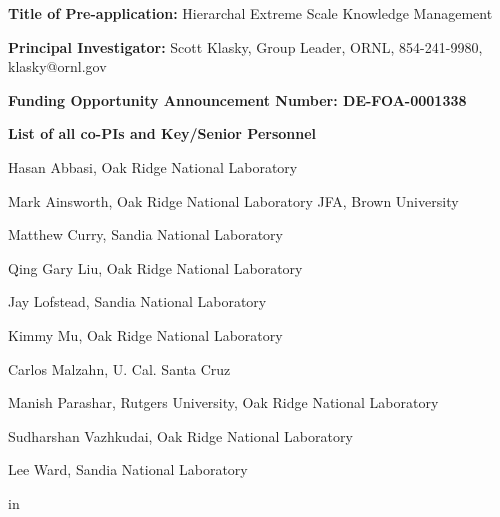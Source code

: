 \documentclass[11pt,letterpaper]{article}
\begin{document}

% 









%

{\bf Title of Pre-application:} Hierarchal Extreme Scale Knowledge Management \par
{\bf Principal Investigator:} Scott Klasky, Group Leader, ORNL, 854-241-9980, klasky@ornl.gov \par
{\bf Funding Opportunity Announcement Number: DE-FOA-0001338} \par
{\bf List of all co-PIs and Key/Senior Personnel} \par
Hasan Abbasi, Oak Ridge National Laboratory \par
Mark Ainsworth, Oak Ridge National Laboratory JFA, Brown University \par
Matthew Curry, Sandia National Laboratory\par
Qing Gary Liu, Oak Ridge National Laboratory \par
Jay Lofstead, Sandia National Laboratory \par
Kimmy Mu, Oak Ridge National Laboratory \par
Carlos Malzahn, U. Cal. Santa Cruz \par
Manish Parashar, Rutgers University, Oak Ridge National Laboratory \par
Sudharshan Vazhkudai, Oak Ridge National Laboratory \par
Lee Ward, Sandia National Laboratory \par
{} in
\end{document}
